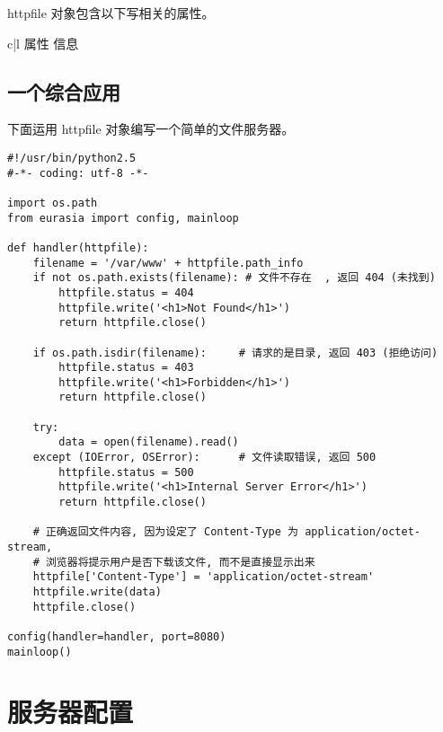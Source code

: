 \documentclass{manual}
\begin{document}
httpfile 对象包含以下写相关的属性。

\begin{tableii}{c|l}{}{ 属性 }{ 信息 }
\end{tableii}


\subsection{一个综合应用}

下面运用 httpfile 对象编写一个简单的文件服务器。


\begin{verbatim}
#!/usr/bin/python2.5
#-*- coding: utf-8 -*-

import os.path
from eurasia import config, mainloop

def handler(httpfile):
	filename = '/var/www' + httpfile.path_info
	if not os.path.exists(filename): # 文件不存在  , 返回 404 (未找到)
		httpfile.status = 404
		httpfile.write('<h1>Not Found</h1>')
		return httpfile.close()

	if os.path.isdir(filename):     # 请求的是目录, 返回 403 (拒绝访问)
		httpfile.status = 403
		httpfile.write('<h1>Forbidden</h1>')
		return httpfile.close()

	try:
		data = open(filename).read()
	except (IOError, OSError):      # 文件读取错误, 返回 500
		httpfile.status = 500
		httpfile.write('<h1>Internal Server Error</h1>')
		return httpfile.close()

	# 正确返回文件内容, 因为设定了 Content-Type 为 application/octet-stream,
	# 浏览器将提示用户是否下载该文件, 而不是直接显示出来
	httpfile['Content-Type'] = 'application/octet-stream'
	httpfile.write(data)
	httpfile.close()

config(handler=handler, port=8080)
mainloop()
\end{verbatim}

\section{服务器配置}
\end{document}

